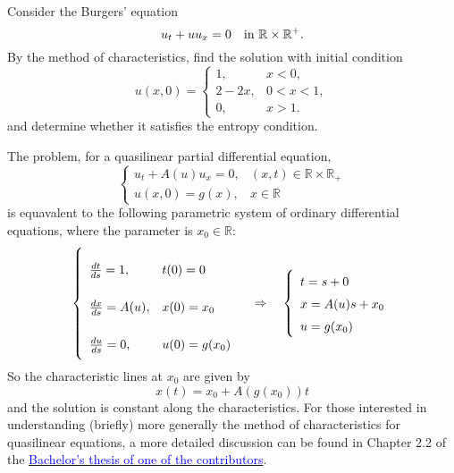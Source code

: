 \newpage
\begin{exercise}
    Consider the Burgers' equation
    \[
        u_t + u u_x = 0 \quad \text{in } \mathbb{R} \times \mathbb{R}^+.
    \]
    By the method of characteristics, find the solution with initial condition
    \[
        u(x,0) = \begin{cases}
            1,      & x < 0,     \\
            2 - 2x, & 0 < x < 1, \\
            0,      & x > 1.
        \end{cases}
    \]
    and determine whether it satisfies the entropy condition.
\end{exercise}
\begin{remark}
    The problem, for a quasilinear partial differential equation,
    \[
        \left\{
        \begin{array}{ll}
            u_t + A(u) u_x = 0, & (x, t) \in \mathbb{R} \times \mathbb{R}_+ \\
            u(x, 0) = g(x),     & x \in \mathbb{R}
        \end{array}
        \right.
    \]
    is equavalent to the following parametric system of ordinary differential
    equations, where the parameter is \(x_0 \in \mathbb{R}\):
    \[
        \renewcommand{\arraystretch}{2.5}
        \left\{
        \begin{array}{ll}

            \frac{dt}{ds} = 1,    & t(0) = 0      \\
            \frac{dx}{ds} = A(u), & x(0) = x_0    \\
            \frac{du}{ds} = 0,    & u(0) = g(x_0)
        \end{array}
        \right.
        \quad \Rightarrow \quad
        \renewcommand{\arraystretch}{1.5}
        \left\{
        \begin{array}{l}
            t = s + 0       \\
            x = A(u)s + x_0 \\
            u = g(x_0)
        \end{array}
        \right.
    \]
    So the characteristic lines at \(x_0\) are given by \[x(t) = x_0 + A(g(x_0))t\] and the solution is constant along the characteristics. For those interested in
    understanding (briefly) more generally the method of characteristics for
    quasilinear equations, a more detailed discussion can be found in Chapter 2.2
    of the \href{https://github.com/alessandropedone/cauchy-kowalevski-theorem}
    {\textcolor{blue}{Bachelor's thesis of one of the contributors}}.
\end{remark}

